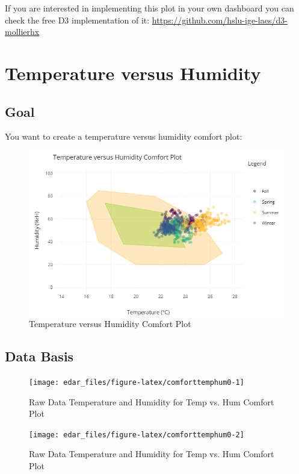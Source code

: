\documentclass[
  a4paperpaper,
]{book}
\begin{document}
If you are interested in implementing this plot in your own dashboard you can check the free D3 implementation of it:
\url{https://github.com/hslu-ige-laes/d3-mollierhx}

\newpage

\hypertarget{temperature-versus-humidity}{%
\section{Temperature versus Humidity}\label{temperature-versus-humidity}}

\hypertarget{goal-19}{%
\subsection{Goal}\label{goal-19}}

You want to create a temperature versus humidity comfort plot:

\begin{figure}
\includegraphics[width=0.7\linewidth]{images/comfortTempHum} \caption{Temperature versus Humidity Comfort Plot}\label{fig:unnamed-chunk-30}
\end{figure}

\hypertarget{data-basis-19}{%
\subsection{Data Basis}\label{data-basis-19}}

\begin{figure}
\texttt{[image: edar\_files/figure-latex/comforttemphum0-1]} \caption{Raw Data Temperature and Humidity for Temp vs. Hum Comfort Plot}\label{fig:comforttemphum0-1}
\end{figure}
\begin{figure}
\texttt{[image: edar\_files/figure-latex/comforttemphum0-2]} \caption{Raw Data Temperature and Humidity for Temp vs. Hum Comfort Plot}\label{fig:comforttemphum0-2}
\end{figure}
\end{document}
